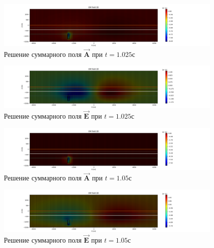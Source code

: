 \begin{figure}
	\centering
	\includegraphics[width=1.0\linewidth]{images/Answer_A_IIstage_time_layer_1.0250000000000006.png}
	\caption{Решение суммарного поля $\overrightarrow{\textbf{A}}$ при $t = 1.025с$}
	\label{fig:A_IIstage_t1}
\end{figure} 


\begin{figure}
	\centering
	\includegraphics[width=1.0\linewidth]{images/Answer_E_IIstage_time_layer_1.0250000000000006.png}
	\caption{Решение суммарного поля $\overrightarrow{\textbf{E}}$ при $t = 1.025с$}
	\label{fig:E_IIstage_t1}
\end{figure} 

\begin{figure}
	\centering
	\includegraphics[width=1.0\linewidth]{images/Answer_A_IIstage_time_layer_1.05.png}
	\caption{Решение суммарного поля $\overrightarrow{\textbf{A}}$ при $t = 1.05с$}
	\label{fig:A_IIstage_t2}
\end{figure} 


\begin{figure}
	\centering
	\includegraphics[width=1.0\linewidth]{images/Answer_E_IIstage_time_layer_1.05.png}
	\caption{Решение суммарного поля $\overrightarrow{\textbf{E}}$ при $t = 1.05с$}
	\label{fig:E_IIstage_t2}
\end{figure} 

